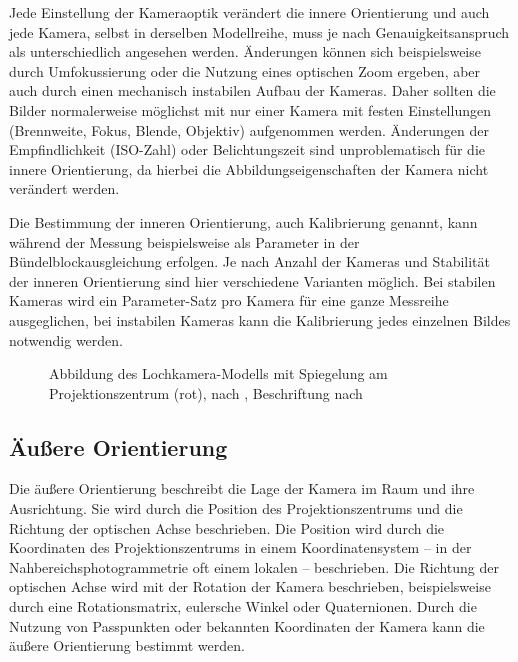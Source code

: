 \documentclass[./00PhotoBox.tex]{subfiles}
\begin{document}
Jede Einstellung der Kameraoptik verändert die innere Orientierung und auch jede Kamera, selbst in derselben Modellreihe, muss je nach Genauigkeitsanspruch als unterschiedlich angesehen werden. Änderungen können sich beispielsweise durch Umfokussierung oder die Nutzung eines optischen Zoom ergeben, aber auch durch einen mechanisch instabilen Aufbau der Kameras. Daher sollten die Bilder normalerweise möglichst mit nur einer Kamera mit festen Einstellungen (Brennweite, Fokus, Blende, Objektiv) aufgenommen werden. Änderungen der Empfindlichkeit (ISO-Zahl) oder Belichtungszeit sind unproblematisch für die innere Orientierung, da hierbei die Abbildungseigenschaften der Kamera nicht verändert werden. \citep[S. 176]{luhmann}

Die Bestimmung der inneren Orientierung, auch Kalibrierung genannt, kann wäh\-rend der Messung beispielsweise als Parameter in der Bündel\-block\-ausgleichung erfolgen. Je nach Anzahl der Kameras und Stabilität der inneren Orientierung sind hier verschiedene Varianten möglich. Bei stabilen Kameras wird ein Parameter-Satz pro Kamera für eine ganze Messreihe ausgeglichen, bei instabilen Kameras kann die Kalibrierung jedes einzelnen Bildes notwendig werden. \citep[S. 181f]{luhmann}

\begin{figure}
    \centering
    
    \caption{Abbildung des Lochkamera-Modells mit Spiegelung am Projektionszentrum (rot), nach \citealt[S. 154]{hartley}, Beschriftung nach \citealt{luhmann}} %
    \label{img:optische_achse}
\end{figure}


\subsection{Äußere Orientierung}
\label{s:aeussereorientierung}
Die äußere Orientierung beschreibt die Lage der Kamera im Raum und ihre Ausrichtung. Sie wird durch die Position des Projektionszentrums und die Richtung der optischen Achse beschrieben. Die Position wird durch die Koordinaten des Projektionszentrums in einem Koordinatensystem -- in der Nahbereichsphotogrammetrie oft einem lokalen -- beschrieben. Die Richtung der optischen Achse wird mit der Rotation der Kamera beschrieben, beispielsweise durch eine Rotationsmatrix, eulersche Winkel oder Quaternionen. Durch die Nutzung von Passpunkten oder bekannten Koordinaten der Kamera kann die äußere Orientierung bestimmt werden. \citep[S. 273ff]{luhmann}
\end{document}
